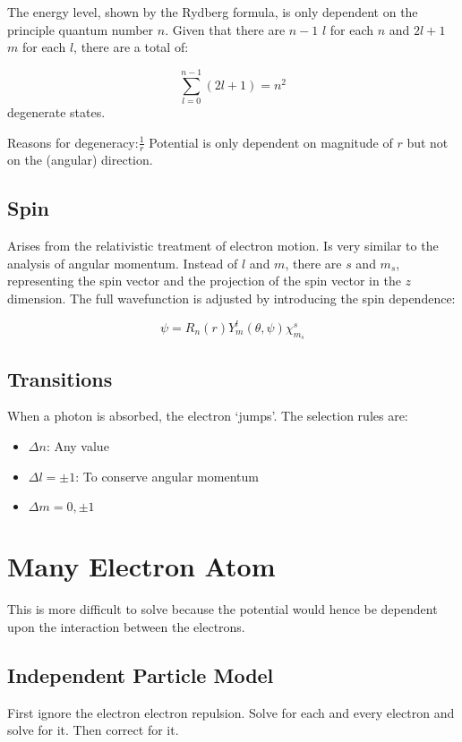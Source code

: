 \documentclass[12pt]{article}
\begin{document}
The energy level, shown by the Rydberg formula, is only dependent on the principle quantum number $n$. Given that there are $n-1$ $l$ for each $n$ and $2l+1$ $m$ for each $l$, there are a total of:

\[\sum^{n-1}_{l=0} (2l+1) = n^2\] degenerate states.

Reasons for degeneracy:$\frac1r$ Potential is only dependent on magnitude of $r$ but not on the (angular) direction. 

\subsection{Spin}

Arises from the relativistic treatment of electron motion. Is very similar to the analysis of angular momentum. Instead of $l$ and $m$, there are $s$ and $m_s$, representing the spin vector and the projection of the spin vector in the $z$ dimension. The full wavefunction is adjusted by introducing the spin dependence:

\[\psi = R_n(r)Y^l_m(\theta, \psi) \chi^s_{m_s}\]

\subsection{Transitions}

When a photon is absorbed, the electron `jumps'. The selection rules are:

\begin{itemize}
    \item $\Delta n$: Any value
    \item $\Delta l = \pm 1$: To conserve angular momentum
    \item $\Delta m = 0, \pm 1$
\end{itemize}    
    
    
\section{Many Electron Atom}

This is more difficult to solve because the potential would hence be dependent upon the interaction between the electrons. 

\subsection{Independent Particle Model}
First ignore the electron electron repulsion. Solve for each and every electron and solve for it. Then correct for it.
\end{document}
